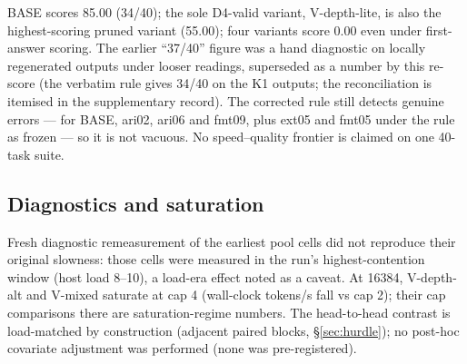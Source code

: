 \documentclass[10pt,letterpaper,twocolumn]{article}
\begin{document}
BASE scores 85.00 (34/40); the sole D4-valid variant,
V-depth-lite, is also the highest-scoring pruned variant (55.00);
four variants score 0.00 even under first-answer scoring. The
earlier ``37/40'' figure was a hand diagnostic on locally
regenerated outputs under looser readings, superseded as a
number by this re-score (the verbatim rule gives 34/40 on the K1
outputs; the reconciliation is itemised in the supplementary
record). The corrected rule still detects genuine errors ---
for BASE, ari02, ari06 and fmt09, plus ext05 and fmt05 under the
rule as frozen --- so it is not vacuous. No speed--quality
frontier is claimed on one 40-task suite.

\subsection{Diagnostics and saturation}
\label{sec:diagnostics}
Fresh diagnostic remeasurement of the earliest pool cells did not
reproduce their original slowness: those cells were measured in
the run's highest-contention window (host load 8--10), a load-era
effect noted as a caveat. At 16384, V-depth-alt and V-mixed
saturate at cap 4 (wall-clock tokens/s fall vs cap 2); their cap
comparisons there are saturation-regime numbers. The head-to-head
contrast is load-matched by construction (adjacent paired blocks,
\S\ref{sec:hurdle}); no post-hoc covariate adjustment was
performed (none was pre-registered).
\end{document}
